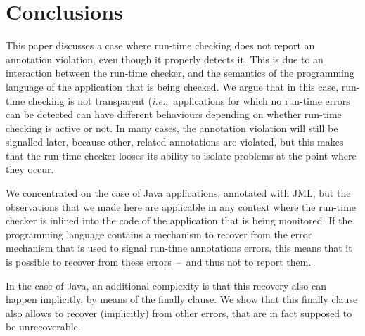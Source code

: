 \documentclass[]{llncs}
\begin{document}
\section{Conclusions}\label{SecConcl}
This paper discusses a case where run-time checking does not report an
annotation violation, even though it properly detects it. This is due
to an interaction between the run-time checker, and the semantics of
the programming language of the application that is being checked. We
argue that in this case, run-time checking is not transparent
(\emph{i.e.},\ applications for which no run-time errors can be
detected can have different behaviours depending on whether run-time
checking is active or not. In many cases, the annotation violation
will still be signalled later, because other, related annotations are
violated, but this makes that the run-time checker looses its ability
to isolate problems at the point where they occur.

We concentrated on the case of Java applications, annotated with JML,
but the observations that we made here are applicable in any context
where the run-time checker is inlined into the code of the application
that is being monitored. If the programming language contains a
mechanism to recover from the error mechanism that is used to signal
run-time annotations errors, this means that it is possible to recover
from these errors~--~and thus not to report them. 

In the case of Java, an additional complexity is that this recovery
also can happen implicitly, by means of the finally clause. We show
that this finally clause also allows to recover (implicitly) from
other errors, that are in fact supposed to be unrecoverable.




\end{document}
